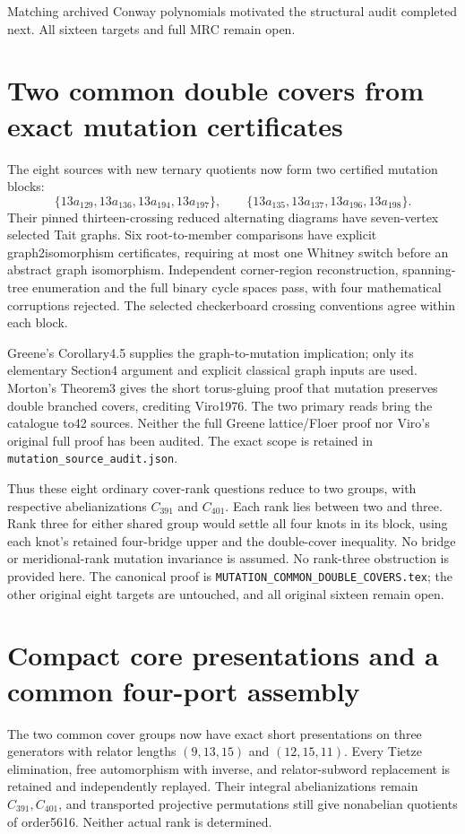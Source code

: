 \documentclass[11pt]{article}
\begin{document}
Matching archived Conway polynomials motivated the structural
audit completed next. All sixteen targets and full MRC remain open.

\section{Two common double covers from exact mutation certificates}

The eight sources with new ternary quotients now form two certified
mutation blocks:
\[
 \{13a_{129},13a_{136},13a_{194},13a_{197}\},\qquad
 \{13a_{135},13a_{137},13a_{196},13a_{198}\}.
\]
Their pinned thirteen-crossing reduced alternating diagrams have
seven-vertex selected Tait graphs. Six root-to-member comparisons have
explicit graph2isomorphism certificates, requiring at most one Whitney
switch before an abstract graph isomorphism. Independent corner-region
reconstruction, spanning-tree enumeration and the full binary cycle
spaces pass, with four mathematical corruptions rejected. The selected
checkerboard crossing conventions agree within each block.

Greene's Corollary4.5 supplies the graph-to-mutation implication;
only its elementary Section4 argument and explicit classical graph
inputs are used. Morton's Theorem3 gives the short torus-gluing proof
that mutation preserves double branched covers, crediting Viro1976.
The two primary reads bring the catalogue to42 sources. Neither the
full Greene lattice/Floer proof nor Viro's original full proof has been
audited. The exact scope is retained in
\texttt{mutation\_source\_audit.json}.

Thus these eight ordinary cover-rank questions reduce to two groups,
with respective abelianizations $C_{391}$ and $C_{401}$. Each rank lies
between two and three. Rank three for either shared group would settle
all four knots in its block, using each knot's retained four-bridge
upper and the double-cover inequality. No bridge or meridional-rank
mutation invariance is assumed. No rank-three obstruction is provided
here. The canonical proof is
\texttt{MUTATION\_COMMON\_DOUBLE\_COVERS.tex}; the other original eight
targets are untouched, and all original sixteen remain open.

\section{Compact core presentations and a common four-port assembly}

The two common cover groups now have exact short presentations on three
generators with relator lengths $(9,13,15)$ and $(12,15,11)$. Every
Tietze elimination, free automorphism with inverse, and relator-subword
replacement is retained and independently replayed. Their integral
abelianizations remain $C_{391},C_{401}$, and transported projective
permutations still give nonabelian quotients of order5616. Neither
actual rank is determined.
\end{document}
